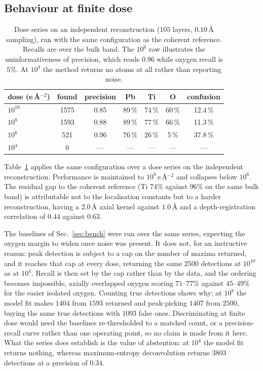 \documentclass[aps,prb,twocolumn,superscriptaddress,floatfix,nofootinbib]{revtex4-2}
\begin{document}
\subsection{Behaviour at finite dose}
\label{sec:dose}

\begin{table}[tb]
  \centering \small
  \begin{tabular}{@{}lcccccc@{}}
    \toprule
    dose (e\,\AA$^{-2}$) & found & precision & Pb & Ti & O & confusion \\
    \midrule
    $10^{10}$ & 1575 & 0.85 & 89\,\% & 74\,\% & 60\,\% & 12.4\,\% \\
    $10^{8}$  & 1593 & 0.88 & 89\,\% & 77\,\% & 66\,\% & 11.3\,\% \\
    $10^{6}$  & \phantom{0}521 & 0.96 & 76\,\% & 26\,\% & \phantom{0}5\,\% & 37.8\,\% \\
    $10^{4}$  & \phantom{000}0 & ---  & --- & --- & --- & --- \\
    \bottomrule
  \end{tabular}
  \caption{Dose series on an independent reconstruction ($105$ layers, $0.10$\,\AA{} sampling),
    run with the same configuration as the coherent reference. Recalls are over the bulk band.
    The $10^{6}$ row illustrates the uninformativeness of precision, which reads $0.96$ while
    oxygen recall is $5\%$. At $10^{4}$ the method returns no atoms at all rather than reporting
    noise.}
  \label{tab:dose}
\end{table}

Table~\ref{tab:dose} applies the same configuration over a dose series on the independent
reconstruction. Performance is maintained to $10^{8}$\,e\,\AA$^{-2}$ and collapses below
$10^{6}$. The residual gap to the coherent reference (Ti $74\%$ against $96\%$ on the same bulk band) is attributable
not to the localisation constants but to a harder reconstruction, having a $2.0$\,\AA{} axial
kernel against $1.0$\,\AA{} and a depth-registration correlation of $0.44$ against $0.63$.

The baselines of Sec.~\ref{sec:bench} were run over the same series, expecting the oxygen margin
to widen once noise was present. It does not, for an instructive reason: peak detection is
subject to a cap on the number of maxima returned, and it reaches that cap at every dose,
returning the same $2500$ detections at $10^{10}$ as at $10^{4}$. Recall is then set by the cap
rather than by the data, and the ordering becomes impossible, axially overlapped oxygen scoring
$71$--$77\%$ against $45$--$49\%$ for the easier isolated oxygen. Counting true detections shows
why: at $10^{8}$ the model fit makes $1404$ from $1593$ returned and peak-picking $1407$ from
$2500$, buying the same true detections with $1093$ false ones. Discriminating at finite dose
would need the baselines re-thresholded to a matched count, or a precision-recall curve rather
than one operating point, so no claim is made from it here. What the series does establish is
the value of abstention: at $10^{4}$ the model fit returns nothing, whereas maximum-entropy
deconvolution returns $3803$ detections at a precision of $0.34$.
\end{document}
